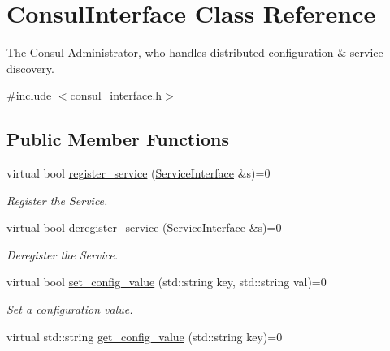 \hypertarget{classConsulInterface}{\section{Consul\-Interface Class Reference}
\label{classConsulInterface}
}


The Consul Administrator, who handles distributed configuration \& service discovery.  




{\ttfamily \#include $<$consul\-\_\-interface.\-h$>$}

\subsection*{Public Member Functions}
\begin{DoxyCompactItemize}
\item 
\hypertarget{classConsulInterface_ad1d3a241b2fc31e4b13789a49a0d010a}{virtual bool \hyperlink{classConsulInterface_ad1d3a241b2fc31e4b13789a49a0d010a}{register\-\_\-service} (\hyperlink{classServiceInterface}{Service\-Interface} \&s)=0}\label{classConsulInterface_ad1d3a241b2fc31e4b13789a49a0d010a}

\begin{DoxyCompactList}\small\item\em Register the Service. \end{DoxyCompactList}\item 
\hypertarget{classConsulInterface_ac97f7a426f3de5023edc637ab984b4c4}{virtual bool \hyperlink{classConsulInterface_ac97f7a426f3de5023edc637ab984b4c4}{deregister\-\_\-service} (\hyperlink{classServiceInterface}{Service\-Interface} \&s)=0}\label{classConsulInterface_ac97f7a426f3de5023edc637ab984b4c4}

\begin{DoxyCompactList}\small\item\em Deregister the Service. \end{DoxyCompactList}\item 
virtual bool \hyperlink{classConsulInterface_a98ce2623db59b3f8804691a4039957a8}{set\-\_\-config\-\_\-value} (std\-::string key, std\-::string val)=0
\begin{DoxyCompactList}\small\item\em Set a configuration value. \end{DoxyCompactList}\item 
\hypertarget{classConsulInterface_a1cc4bdfe75f86f69626e109847aba6af}{virtual std\-::string \hyperlink{classConsulInterface_a1cc4bdfe75f86f69626e109847aba6af}{get\-\_\-config\-\_\-value} (std\-::string key)=0}\label{classConsulInterface_a1cc4bdfe75f86f69626e109847aba6af}


\end{DoxyCompactItemize}
